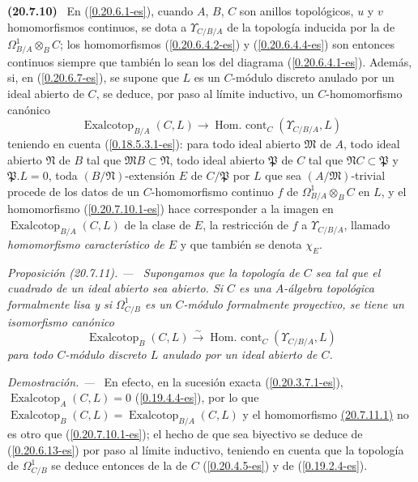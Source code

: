 \documentclass[10pt,oneside]{book}
\makeatletter
\newcommand{\sref}[1]{\textup{(\ref{#1})}}
\newcommand{\setmanualcurrentlabel}[1]{\def\@currentlabel{#1}}
\newenvironment{env}[1][]{\setmanualcurrentlabel{#1}\par\medskip\noindent\textbf{(#1)}\ }{\par}
\newenvironment{proposition}[1][]{%
  \setmanualcurrentlabel{#1}\par\medskip\noindent\itshape Proposición (#1). ---\ }{\par}
\newenvironment{proof}{%
  \par\medskip\noindent\textit{Demostración. ---\ }}{\par}
\makeatother
\begin{document}
\begin{env}[20.7.10]
\label{0.20.7.10-es}
En \sref{0.20.6.1-es}, cuando $A$, $B$, $C$ son anillos topológicos,
$u$ y $v$ homomorfismos continuos, se dota a $\Upsilon_{C/B/A}$ de la
topología inducida por la de $\Omega^1_{B/A}\otimes_B C$; los
homomorfismos \sref{0.20.6.4.2-es} y \sref{0.20.6.4.4-es} son entonces
continuos siempre que también lo sean los del diagrama
\sref{0.20.6.4.1-es}. Además, si, en \sref{0.20.6.7-es}, se supone que
$L$ es un $C$-módulo discreto anulado por un ideal abierto de $C$, se deduce,
por paso al límite inductivo, un $C$-homomorfismo canónico
\begin{equation}
\tag{20.7.10.1}
\label{0.20.7.10.1-es}
  \operatorname{Exalcotop}_{B/A}(C,L)\to
  \operatorname{Hom.\ cont}_C(\Upsilon_{C/B/A},L)
\end{equation}
teniendo en cuenta \sref{0.18.5.3.1-es}: para todo ideal abierto
$\mathfrak{M}$ de $A$, todo ideal abierto $\mathfrak{N}$ de $B$ tal que
$\mathfrak{M}B\subset\mathfrak{N}$, todo ideal abierto $\mathfrak{P}$ de $C$
tal que $\mathfrak{N}C\subset\mathfrak{P}$ y $\mathfrak{P}.L=0$, toda
$(B/\mathfrak{N})$-extensión $E$ de $C/\mathfrak{P}$ por $L$ que sea
$(A/\mathfrak{M})$-trivial procede de los datos de un $C$-homomorfismo
continuo $f$ de $\Omega^1_{B/A}\otimes_B C$ en $L$, y el homomorfismo
\sref{0.20.7.10.1-es} hace corresponder a la imagen en
$\operatorname{Exalcotop}_{B/A}(C,L)$ de la clase de $E$, la restricción de
$f$ a $\Upsilon_{C/B/A}$, llamado \emph{homomorfismo característico de $E$}
y que también se denota $\chi_E$.
\end{env}

\begin{proposition}[20.7.11]
\label{0.20.7.11-es}
Supongamos que la topología de $C$ sea tal que el cuadrado de un ideal abierto
sea abierto. Si $C$ es una $A$-álgebra topológica formalmente lisa y si
$\Omega^1_{C/B}$ es un $C$-módulo formalmente proyectivo, se tiene un
isomorfismo canónico
\begin{equation}
\tag{20.7.11.1}
\label{0.20.7.11.1-es}
  \operatorname{Exalcotop}_B(C,L)\xrightarrow{\sim}
  \operatorname{Hom.\ cont}_C(\Upsilon_{C/B/A},L)
\end{equation}
para todo $C$-módulo discreto $L$ anulado por un ideal abierto de $C$.
\end{proposition}

\begin{proof}
En efecto, en la sucesión exacta \sref{0.20.3.7.1-es},
$\operatorname{Exalcotop}_A(C,L)=0$ \sref{0.19.4.4-es}, por lo que
$\operatorname{Exalcotop}_B(C,L)=\operatorname{Exalcotop}_{B/A}(C,L)$ y
el homomorfismo \hyperref[0.20.7.8.1-es]{\textup{(20.7.11.1)}} no es otro que
\sref{0.20.7.10.1-es}; el hecho de que sea biyectivo se deduce de
\sref{0.20.6.13-es} por paso al límite inductivo, teniendo en cuenta que
la topología de $\Omega^1_{C/B}$ se deduce entonces de la de $C$
\sref{0.20.4.5-es} y de \sref{0.19.2.4-es}.
\end{proof}
\end{document}
